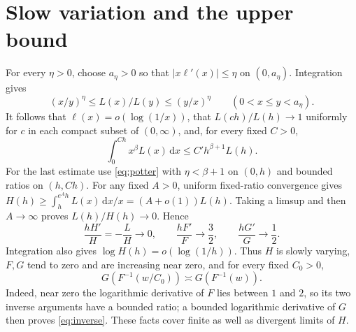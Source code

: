 \documentclass[11pt]{article}
\theoremstyle{remark}\newtheorem{remark}[theorem]{Remark}
\newcommand{\dd}{\,\mathrm d}
\begin{document}
\section{Slow variation and the upper bound}
For every $\eta>0$, choose $a_\eta>0$ so that $|x\ell'(x)|\le\eta$ on $(0,a_\eta)$. Integration gives
\begin{equation}\label{eq:potter}
 (x/y)^\eta\le L(x)/L(y)\le(y/x)^\eta\qquad(0<x\le y<a_\eta).
\end{equation}
It follows that $\ell(x)=o(\log(1/x))$, that $L(ch)/L(h)\to1$ uniformly for $c$ in each compact subset of $(0,\infty)$, and, for every fixed $C>0$,
\begin{equation}\label{eq:boundary-integral}
 \int_0^{Ch}x^\beta L(x)\dd x\le C' h^{\beta+1}L(h).
\end{equation}
For the last estimate use \eqref{eq:potter} with $\eta<\beta+1$ on $(0,h)$ and bounded ratios on $(h,Ch)$.
For any fixed $A>0$, uniform fixed-ratio convergence gives
$H(h)\ge\int_h^{e^Ah}L(x)\dd x/x=(A+o(1))L(h)$.
Taking a limsup and then $A\to\infty$ proves $L(h)/H(h)\to0$. Hence
\begin{equation}\label{eq:derivatives}
 \frac{hH'}H=-\frac LH\longrightarrow0,\qquad
 \frac{hF'}F\longrightarrow\frac32,\qquad
 \frac{hG'}G\longrightarrow\frac12.
\end{equation}
Integration also gives $\log H(h)=o(\log(1/h))$. Thus $H$ is slowly varying, $F,G$ tend to zero and are increasing near zero, and for every fixed $C_0>0$,
\begin{equation}\label{eq:inverse}
 G(F^{-1}(w/C_0))\asymp G(F^{-1}(w)).
\end{equation}
Indeed, near zero the logarithmic derivative of $F$ lies between $1$ and $2$, so its two inverse arguments have a bounded ratio; a bounded logarithmic derivative of $G$ then proves \eqref{eq:inverse}. These facts cover finite as well as divergent limits of $H$.
\end{document}
